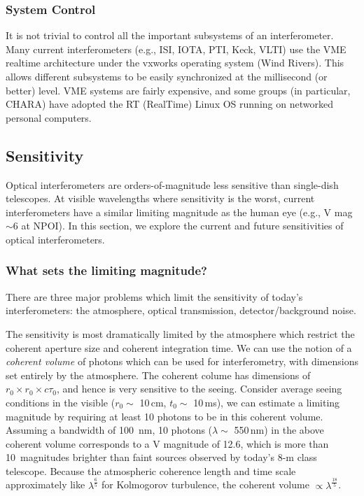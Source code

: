 \documentclass[12pt]{iopart}
\begin{document}
\subsubsection{System Control}

It is not trivial to control all the important subsystems of an
interferometer.  Many current interferometers (e.g., ISI, IOTA, PTI,
Keck, VLTI) use the VME realtime architecture under the vxworks
operating system (Wind Rivers).  This allows different subsystems to
be easily synchronized at the millisecond (or better) level.  VME systems are
fairly expensive, and some groups (in particular, CHARA) have adopted
the RT (RealTime) Linux OS running on networked personal computers.


\subsection{Sensitivity}
\label{sensitivity}

Optical interferometers are orders-of-magnitude less sensitive than
single-dish telescopes.  At visible wavelengths where sensitivity is
the worst, current interferometers have a similar limiting magnitude
as the human eye (e.g., V mag $\sim$6 at NPOI). In this section, we explore
the current and future sensitivities of optical interferometers.

\subsubsection{What sets the limiting magnitude?}
There are three major problems which limit the sensitivity of today's
interferometers: the atmosphere, optical transmission,
detector/background noise.

The sensitivity is most dramatically limited by the atmosphere which
restrict the coherent aperture size and coherent integration time.  We
can use the notion of a {\em coherent volume} of photons which can be
used for interferometry, with dimensions set entirely by the
atmosphere.  The coherent colume has dimensions of $r_0 \times r_0
\times c \tau_0$, and hence is very sensitive to the seeing.  Consider
average seeing conditions in the visible ($r_0 \sim$ 10\,cm, $t_0
\sim$ 10\,ms), we can estimate a limiting magnitude by requiring at
least 10 photons to be in this coherent volume.  Assuming a bandwidth
of 100~nm, 10 photons ($\lambda\sim$ 550\,nm) in the above coherent
volume corresponds to a V magnitude of 12.6, which is more than
10~magnitudes brighter than faint sources observed by today's 8-m
class telescope.  Because the atmospheric coherence length and time
scale approximately like $\lambda^{\frac{6}{5}}$ for Kolmogorov
turbulence, the coherent volume $\propto \lambda^\frac{18}{5}$.
\end{document}
